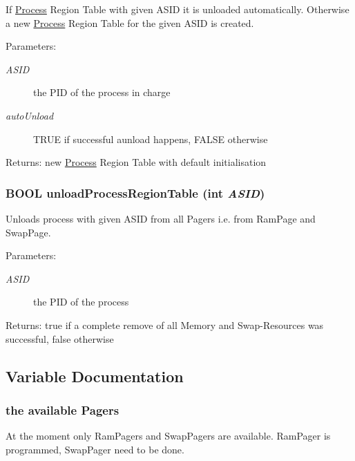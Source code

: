 If \hyperlink{struct_process}{Process} Region Table with given ASID it is unloaded automatically. Otherwise a new \hyperlink{struct_process}{Process} Region Table for the given ASID is created. \begin{Desc}
\item[Parameters:]
\begin{description}
\item[{\em ASID}]the PID of the process in charge \item[{\em autoUnload}]TRUE if successful aunload happens, FALSE otherwise \end{description}
\end{Desc}
\begin{Desc}
\item[Returns:]new \hyperlink{struct_process}{Process} Region Table with default initialisation \end{Desc}
\hypertarget{group___v_m_m___p_r_t_g3005fc0af040931da544c349f3f3997b}{
\subsubsection[{unloadProcessRegionTable}]{\setlength{\rightskip}{0pt plus 5cm}BOOL unloadProcessRegionTable (int {\em ASID})}}
\label{group___v_m_m___p_r_t_g3005fc0af040931da544c349f3f3997b}


Unloads process with given ASID from all Pagers i.e. from RamPage and SwapPage. \begin{Desc}
\item[Parameters:]
\begin{description}
\item[{\em ASID}]the PID of the process \end{description}
\end{Desc}
\begin{Desc}
\item[Returns:]true if a complete remove of all Memory and Swap-Resources was successful, false otherwise \end{Desc}


\subsection{Variable Documentation}
\hypertarget{group___v_m_m___p_r_t_gd51c26b7297e20a13f290d1a9063efa5}{
\subsubsection[{Pagers}]{ the available {\bf Pagers}}}
\label{group___v_m_m___p_r_t_gd51c26b7297e20a13f290d1a9063efa5}


At the moment only RamPagers and SwapPagers are available. RamPager is programmed, SwapPager need to be done. 